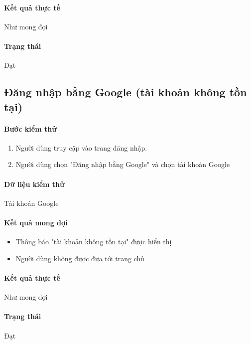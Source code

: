 \documentclass[./../main.tex]{subfiles}
\begin{document}
\paragraph*{Kết quả thực tế} Như mong đợi

\paragraph*{Trạng thái} Đạt

\subsection{Đăng nhập bằng Google (tài khoản không tồn tại)}

\paragraph*{Bước kiểm thử}

\begin{enumerate}
    \item Người dùng truy cập vào trang đăng nhập.
    \item Người dùng chọn "Đăng nhập bằng Google" và chọn tài khoản Google
\end{enumerate}

\paragraph*{Dữ liệu kiểm thử} Tài khoản Google

\paragraph*{Kết quả mong đợi}

\begin{itemize}
    \item Thông báo "tài khoản không tồn tại" được hiển thị
    \item Người dùng không được đưa tới trang chủ
\end{itemize}

\paragraph*{Kết quả thực tế} Như mong đợi

\paragraph*{Trạng thái} Đạt
\end{document}
